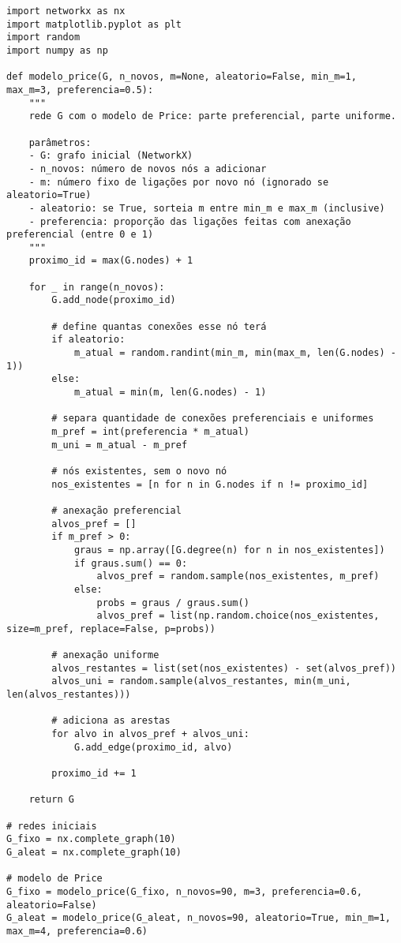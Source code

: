 \documentclass{article}
\begin{document}
\begin{verbatim}
import networkx as nx
import matplotlib.pyplot as plt
import random
import numpy as np

def modelo_price(G, n_novos, m=None, aleatorio=False, min_m=1, max_m=3, preferencia=0.5):
    """
    rede G com o modelo de Price: parte preferencial, parte uniforme.

    parâmetros:
    - G: grafo inicial (NetworkX)
    - n_novos: número de novos nós a adicionar
    - m: número fixo de ligações por novo nó (ignorado se aleatorio=True)
    - aleatorio: se True, sorteia m entre min_m e max_m (inclusive)
    - preferencia: proporção das ligações feitas com anexação preferencial (entre 0 e 1)
    """
    proximo_id = max(G.nodes) + 1

    for _ in range(n_novos):
        G.add_node(proximo_id)

        # define quantas conexões esse nó terá
        if aleatorio:
            m_atual = random.randint(min_m, min(max_m, len(G.nodes) - 1))
        else:
            m_atual = min(m, len(G.nodes) - 1)

        # separa quantidade de conexões preferenciais e uniformes
        m_pref = int(preferencia * m_atual)
        m_uni = m_atual - m_pref

        # nós existentes, sem o novo nó
        nos_existentes = [n for n in G.nodes if n != proximo_id]

        # anexação preferencial
        alvos_pref = []
        if m_pref > 0:
            graus = np.array([G.degree(n) for n in nos_existentes])
            if graus.sum() == 0:
                alvos_pref = random.sample(nos_existentes, m_pref)
            else:
                probs = graus / graus.sum()
                alvos_pref = list(np.random.choice(nos_existentes, size=m_pref, replace=False, p=probs))

        # anexação uniforme
        alvos_restantes = list(set(nos_existentes) - set(alvos_pref))
        alvos_uni = random.sample(alvos_restantes, min(m_uni, len(alvos_restantes)))

        # adiciona as arestas
        for alvo in alvos_pref + alvos_uni:
            G.add_edge(proximo_id, alvo)

        proximo_id += 1

    return G

# redes iniciais
G_fixo = nx.complete_graph(10)
G_aleat = nx.complete_graph(10)

# modelo de Price
G_fixo = modelo_price(G_fixo, n_novos=90, m=3, preferencia=0.6, aleatorio=False)
G_aleat = modelo_price(G_aleat, n_novos=90, aleatorio=True, min_m=1, max_m=4, preferencia=0.6)


\end{verbatim}
\end{document}
